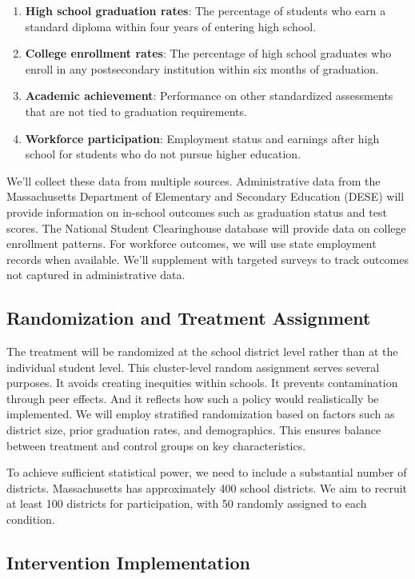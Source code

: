 \documentclass[12pt]{article}
\begin{document}
\begin{enumerate}
    \item \textbf{High school graduation rates}: The percentage of students who earn a standard diploma within four years of entering high school.
    \item \textbf{College enrollment rates}: The percentage of high school graduates who enroll in any postsecondary institution within six months of graduation.
    \item \textbf{Academic achievement}: Performance on other standardized assessments that are not tied to graduation requirements.
    \item \textbf{Workforce participation}: Employment status and earnings after high school for students who do not pursue higher education.
\end{enumerate}

We'll collect these data from multiple sources. Administrative data from the Massachusetts Department of Elementary and Secondary Education (DESE) will provide information on in-school outcomes such as graduation status and test scores. The National Student Clearinghouse database will provide data on college enrollment patterns. For workforce outcomes, we will use state employment records when available. We'll supplement with targeted surveys to track outcomes not captured in administrative data.

\subsection{Randomization and Treatment Assignment}

The treatment will be randomized at the school district level rather than at the individual student level. This cluster-level random assignment serves several purposes. It avoids creating inequities within schools. It prevents contamination through peer effects. And it reflects how such a policy would realistically be implemented. We will employ stratified randomization based on factors such as district size, prior graduation rates, and demographics. This ensures balance between treatment and control groups on key characteristics.

To achieve sufficient statistical power, we need to include a substantial number of districts. Massachusetts has approximately 400 school districts. We aim to recruit at least 100 districts for participation, with 50 randomly assigned to each condition.

\subsection{Intervention Implementation}
\end{document}
